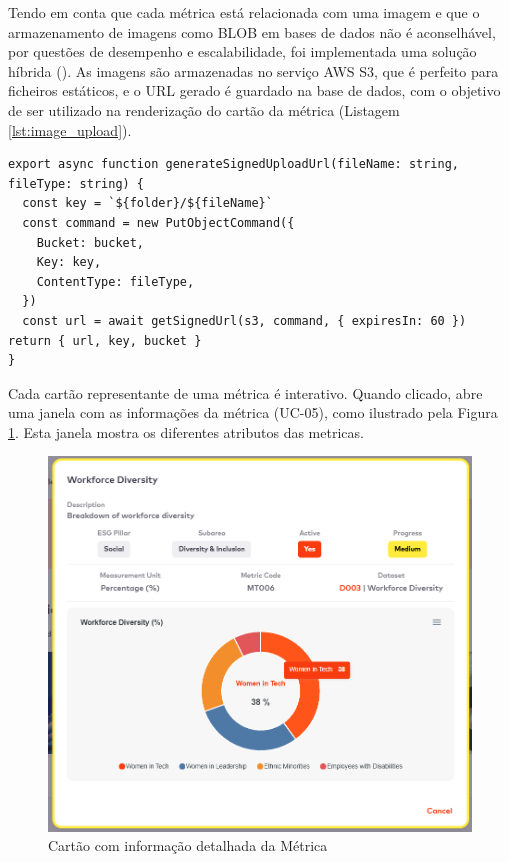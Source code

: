 Tendo em conta que cada métrica está relacionada com uma imagem e que o armazenamento de imagens como BLOB em bases de dados não é aconselhável, por questões de desempenho e escalabilidade, foi implementada uma solução híbrida (\cite{code-examplesnet2025}). As imagens são armazenadas no serviço AWS S3, que é perfeito para ficheiros estáticos, e o URL gerado é guardado na base de dados, com o objetivo de ser utilizado na renderização do cartão da métrica (Listagem \ref{lst:image_upload}).

\begin{lstlisting}[style=customts, caption={Função de \textit{Upload} de uma imagem para o AWS S3}, label={lst:image_upload}]
export async function generateSignedUploadUrl(fileName: string, fileType: string) {
  const key = `${folder}/${fileName}`
  const command = new PutObjectCommand({
    Bucket: bucket,
    Key: key,
    ContentType: fileType,
  })
  const url = await getSignedUrl(s3, command, { expiresIn: 60 })
return { url, key, bucket }
}
\end{lstlisting}

Cada cartão representante de uma métrica é interativo. Quando clicado, abre uma janela com as informações da métrica (UC-05), como ilustrado pela Figura \ref{fig:metric_info}. Esta janela mostra os diferentes atributos das metricas.

\begin{figure}[H]
    \centering
    \includegraphics[width=5.5in,keepaspectratio]{frontmatter/assets/platform_prints/metrics/metric_info.png}
    \caption{Cartão com informação detalhada da Métrica}
    \label{fig:metric_info}
\end{figure}


